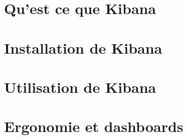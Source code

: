 \section{Qu'est ce que Kibana}



\section{Installation de Kibana}



\section{Utilisation de Kibana}


\section{Ergonomie et dashboards}
